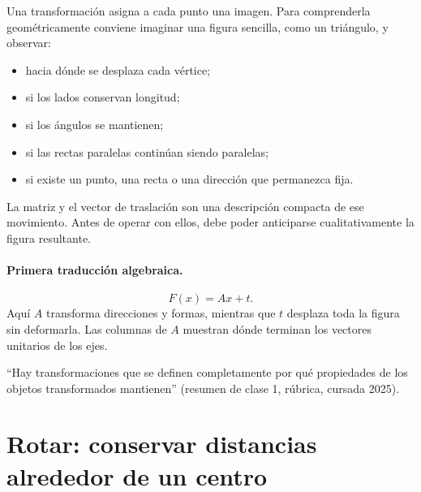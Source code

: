 Una transformación asigna a cada punto una imagen. Para comprenderla geométricamente conviene
imaginar una figura sencilla, como un triángulo, y observar:
\begin{itemize}
  \item hacia dónde se desplaza cada vértice;
  \item si los lados conservan longitud;
  \item si los ángulos se mantienen;
  \item si las rectas paralelas continúan siendo paralelas;
  \item si existe un punto, una recta o una dirección que permanezca fija.
\end{itemize}

\begin{center}
\end{center}

La matriz y el vector de traslación son una descripción compacta de ese movimiento. Antes de
operar con ellos, debe poder anticiparse cualitativamente la figura resultante.

\paragraph{Primera traducción algebraica.}
\[
  F(x)=Ax+t.
\]
Aquí \(A\) transforma direcciones y formas, mientras que \(t\) desplaza toda la figura sin
deformarla. Las columnas de \(A\) muestran dónde terminan los vectores unitarios de los ejes.

\begin{idea}
``Hay transformaciones que se definen completamente por qué propiedades de los objetos
transformados mantienen'' (resumen de clase 1, rúbrica, cursada 2025).
\end{idea}

\section{Rotar: conservar distancias alrededor de un centro}\label{sec:rotar}

